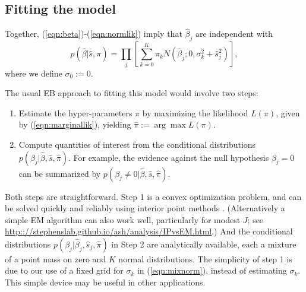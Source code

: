 \documentclass[11pt]{article}
\def\bhat{\hat{\beta}}
\def\shat{\hat{s}}
\begin{document}
% 
% 
 

\subsection*{Fitting the model}
 
Together, (\ref{eqn:beta})-(\ref{eqn:normlik}) imply that $\bhat_j$ are independent with
\begin{equation} \label{eqn:marginallik}
p(\bhat | \shat, \pi) =   \prod_j  \left[\sum_{k=0}^K \pi_k N(\bhat_j; 0, \sigma_k^2 + \shat_j^2) \right],
\end{equation}
where we define $\sigma_0:=0$.

The usual EB approach to fitting this model would involve two steps:
\begin{enumerate}
\item Estimate the hyper-parameters $\pi$ by maximizing the likelihood $L(\pi)$, given by (\ref{eqn:marginallik}), yielding $\hat{\pi} := \arg \max L(\pi)$.
\item Compute quantities of interest from the conditional distributions $p(\beta_j | \bhat, \shat, \hat{\pi})$. For example, the evidence
against the null hypothesis $\beta_j=0$ can be summarized by $p(\beta_j \neq 0 | \bhat, \shat,\hat{\pi})$.
\end{enumerate}
Both steps are straightforward. Step 1 is a convex optimization problem, and can be solved quickly and reliably using interior point methods \cite{boyd2004convex,koenker2013convex}. (Alternatively a simple EM algorithm can also work well, particularly for modest $J$; see \url{http:://stephenslab.github.io/ash/analysis/IPvsEM.html}.) 
And the conditional distributions $p(\beta_j | \bhat_j, \shat_j,\hat{\pi})$ in Step 2 are analytically available, each a mixture of a point mass on zero and $K$ normal distributions.
The simplicity of step 1 is due to our use of a fixed grid for $\sigma_k$ in (\ref{eqn:mixnorm}), instead of estimating $\sigma_k$. This simple device may be useful in other applications.
\end{document}
